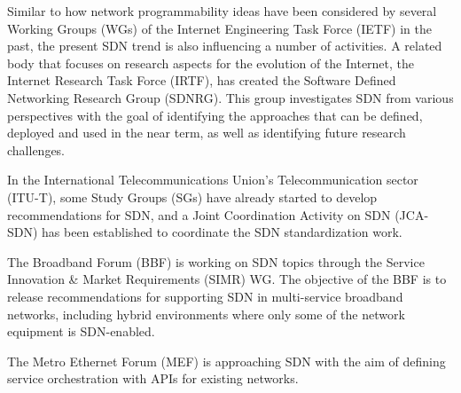 {%
Similar to how network programmability ideas have been considered by several Working Groups (WGs) of the Internet Engineering Task Force (IETF) in the past, the present SDN trend is also influencing a number of activities. 
A related body that focuses on research aspects for the evolution of the Internet, the Internet Research Task Force (IRTF), has created the Software Defined Networking Research Group (SDNRG).
This group investigates SDN from various perspectives with the goal of identifying the approaches that can be defined, deployed and used in the near term, as well as identifying future research challenges.

In the International Telecommunications Union's Telecommunication sector (ITU-T), some Study Groups (SGs) have already started to develop recommendations for SDN, 
and a Joint Coordination Activity on SDN (JCA-SDN) has been established to coordinate the SDN standardization work.%

The Broadband Forum (BBF) is working on SDN topics through the Service Innovation \& Market Requirements (SIMR) WG. The objective of the BBF is to release recommendations for supporting SDN in multi-service broadband networks, including hybrid environments where only some of the network equipment is SDN-enabled.

The Metro Ethernet Forum (MEF) is approaching SDN with the aim of defining service orchestration with APIs for existing networks. %

}
